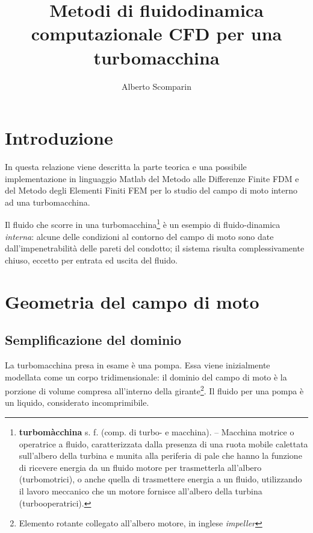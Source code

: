 \documentclass{tufte-handout}
\title{Metodi di fluidodinamica computazionale CFD per una turbomacchina}
\author[Alberto Scomparin]{Alberto Scomparin}
\begin{document}
\maketitle

\newpage

\tableofcontents

\newpage

\section{Introduzione}
\noindent
In questa relazione viene descritta la parte teorica e una possibile
implementazione in linguaggio Matlab del Metodo alle Differenze Finite \textsc{FDM} e del Metodo degli Elementi Finiti \textsc{FEM}
per lo studio del campo di moto interno ad una turbomacchina.

Il fluido che scorre in una turbomacchina\footnote{\textbf{turbomàcchina}
s. f. (comp. di turbo- e macchina).
– Macchina motrice o operatrice a fluido, caratterizzata dalla presenza
di una ruota mobile calettata sull'albero della turbina
e munita alla periferia di pale che hanno la funzione di ricevere energia da
un fluido motore per trasmetterla all'albero
(turbomotrici), o anche quella
di trasmettere energia a un fluido, utilizzando il lavoro meccanico
che un motore fornisce all'albero della turbina (turbooperatrici).}
è un esempio di fluido-dinamica \emph{interna}: alcune delle condizioni al contorno 
del campo di moto sono date dall'impenetrabilità delle pareti del condotto; il sistema
risulta complessivamente chiuso, eccetto per entrata ed uscita del fluido.

\newpage

\section{Geometria del campo di moto}\label{sec:geometria}
\subsection{Semplificazione del dominio}\label{sec:turbomacchina}
La turbomacchina presa in esame è una pompa. Essa viene inizialmente modellata
come un corpo tridimensionale: il dominio del campo di moto è la porzione
di volume compresa all'interno della girante\footnote{Elemento rotante collegato all'albero
motore, in inglese \emph{impeller}}.
Il fluido per una pompa è un liquido, considerato incomprimibile.
\end{document}
